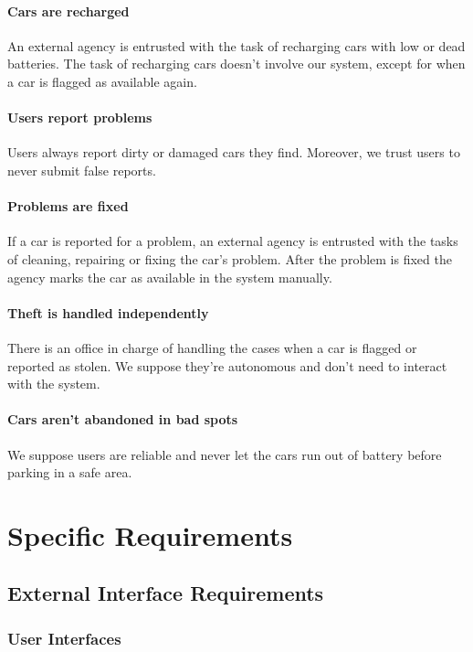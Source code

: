 \documentclass[english]{article}
\begin{document}
\paragraph{Cars are recharged}
An external agency is entrusted with the task of recharging cars with low or dead batteries. The task of recharging cars doesn't involve our system, except for when a car is flagged as available again.

\paragraph{Users report problems}
Users always report dirty or damaged cars they find. Moreover, we trust users to never submit false reports.

\paragraph{Problems are fixed}
If a car is reported for a problem, an external agency is entrusted with the tasks of cleaning, repairing or fixing the car's problem. After the problem is fixed the agency marks the car as available in the system manually.

\paragraph{Theft is handled independently}
There is an office in charge of handling the cases when a car is flagged or reported as stolen.
We suppose they're autonomous and don't need to interact with the system.

\paragraph{Cars aren't abandoned in bad spots}
We suppose users are reliable and never let the cars run out of battery before parking in a safe area.

\newpage

\section{Specific Requirements}

\subsection{External Interface Requirements}

\subsubsection{User Interfaces}
\end{document}
